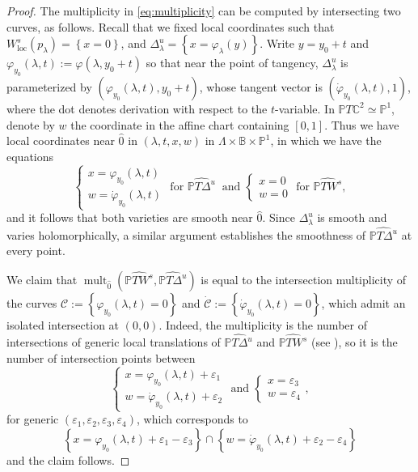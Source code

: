 \documentclass[11pt, oneside]{amsart}
\newcommand{\C}{\mathbb{C}}
\newcommand{\B}{\mathbb{B}}
\renewcommand{\P}{\mathbb{P}}
\newcommand{\e}{\varepsilon}
\newcommand{\set}[1]{\left\{#1\right\}}
\newcommand{\pu}{{\mathbb{P}^1}}
\newcommand{\loc}{{\mathrm{loc}}}
\DeclareMathOperator{\mult}{mult}
\theoremstyle{remark}
\theoremstyle{definition}
\theoremstyle{theorem}
\newcommand{\commentaire}[1]{}
\begin{document}
\begin{proof} 
The multiplicity in \eqref{eq:multiplicity} can be computed by intersecting two curves, as follows. Recall that we fixed local  coordinates such that $W^s_\loc(p_\lambda) = \set{x=0}$, and 
$\Delta^u_\lambda = \set{x= \varphi_\lambda(y)}$. Write $y=y_0+t$ and $\varphi_{y_0}(\lambda, t ) :=\varphi(\lambda, y_0+t)$ so that near the point of tangency, $\Delta^u_\lambda$ is parameterized by $(  \varphi_{y_0}(\lambda, t ),y_0+t )$, whose tangent vector 
is $(\dot{\varphi}_{y_0}(\lambda, t),1)$, 
where the dot denotes derivation with respect to the $t$-variable. In 
$\P T\C^2\simeq\P^1$, denote by $w$ the coordinate in 
 the affine chart containing $[0, 1]$. Thus we have local coordinates near $\widehat 0$ in
 $(\lambda, t, x, w)$   in 
 $\Lambda\times \B \times \pu$, in which we have the equations 
 $$\begin{cases} x= \varphi_{y_0}(\lambda, t) \\ w  = \dot{\varphi}_{y_0}(\lambda,  t) \end{cases} \text{ for } 
 \widehat {\P T \Delta^u} \ \text{ and } 
 \begin{cases} x=0 \\ w  = 0 \end{cases} \text{ for } 
 \widehat {\P T W^s},$$
 and it follows that both varieties are smooth near $\widehat 0$.   
Since $\Delta^u_\lambda$ is smooth and varies holomorphically, a similar argument  establishes  the  smoothness of  $\widehat {\P T \Delta^u}$ at every point. 
 
 We claim that    
   $  \mult_{\hat{0}}({\widehat {\P T W^s}, \widehat {\P T \Delta^u}})$ is equal to 
 the intersection multiplicity of the curves 
 $\mathcal C:= \set{\varphi_{y_0}(\lambda, t)  = 0}$ and $\dot{\mathcal {C}}:= 
 \set{\dot{\varphi}_{y_0}(\lambda, t) = 0}$, which 
 admit an isolated intersection at $(0,0)$. \commentaire{Precision added here}
 Indeed,  
  the multiplicity  is  the number of intersections of  generic local  translations of 
 $ \widehat {\P T \Delta^u}$ and $ \widehat {\P T W^s}$ (see \cite[\S 12]{chirka}), so it is the number of intersection points between 
   $$\begin{cases} x= \varphi_{y_0}(\lambda, t) +\e_1 \\ w  = \dot{\varphi}_{y_0}(\lambda,  t)  +\e_2 \end{cases}   \text{ and } 
 \begin{cases} x=\e_3 \\ w  = \e_4 \end{cases},$$ for generic $(\e_1, \e_2, \e_3, \e_4)$, which corresponds to  
 $$\set{x= \varphi_{y_0}(\lambda, t) +\e_1 - \e_3}\cap \set{w  = \dot{\varphi}_{y_0}(\lambda,  t) + \e_2  -\e_4}
 $$ 
 and the claim follows. 
 

\end{proof}
\end{document}
